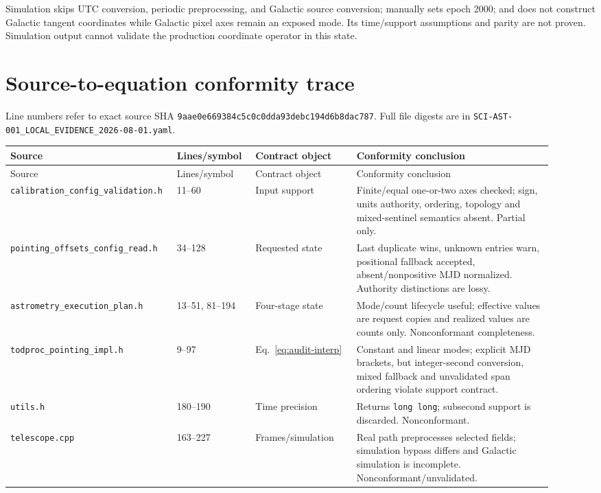 \documentclass[11pt]{article}
\newcommand{\code}[1]{\nolinkurl{#1}}
\begin{document}
Simulation skips UTC conversion, periodic preprocessing, and Galactic source
conversion; manually sets epoch 2000; and does not construct Galactic tangent
coordinates while Galactic pixel axes remain an exposed mode. Its time/support
assumptions and parity are not proven. Simulation output cannot validate the
production coordinate operator in this state.

\section{Source-to-equation conformity trace}

Line numbers refer to exact source SHA
\code{9aae0e669384c5c0c0dda93debc194d6b8dac787}.  Full file digests are in
\code{SCI-AST-001_LOCAL_EVIDENCE_2026-08-01.yaml}.

\begin{longtable}{L{0.25\linewidth}L{0.14\linewidth}L{0.18\linewidth}L{0.35\linewidth}}
\toprule
Source & Lines/symbol & Contract object & Conformity conclusion \\
\midrule
\endfirsthead
\toprule
Source & Lines/symbol & Contract object & Conformity conclusion \\
\midrule
\endhead
\code{calibration_config_validation.h} & 11--60 & Input support & Finite/equal one-or-two axes checked; sign, units authority, ordering, topology and mixed-sentinel semantics absent. Partial only. \\
\code{pointing_offsets_config_read.h} & 34--128 & Requested state & Last duplicate wins, unknown entries warn, positional fallback accepted, absent/nonpositive MJD normalized. Authority distinctions are lossy. \\
\code{astrometry_execution_plan.h} & 13--51, 81--194 & Four-stage state & Mode/count lifecycle useful; effective values are request copies and realized values are counts only. Nonconformant completeness. \\
\code{todproc_pointing_impl.h} & 9--97 & Eq.~\eqref{eq:audit-interp} & Constant and linear modes; explicit MJD brackets, but integer-second conversion, mixed fallback and unvalidated span ordering violate support contract. \\
\code{utils.h} & 180--190 & Time precision & Returns \code{long long}; subsecond support is discarded. Nonconformant. \\
\code{telescope.cpp} & 163--227 & Frames/simulation & Real path preprocesses selected fields; simulation bypass differs and Galactic simulation is incomplete. Nonconformant/unvalidated. \\

\end{longtable}
\end{document}
